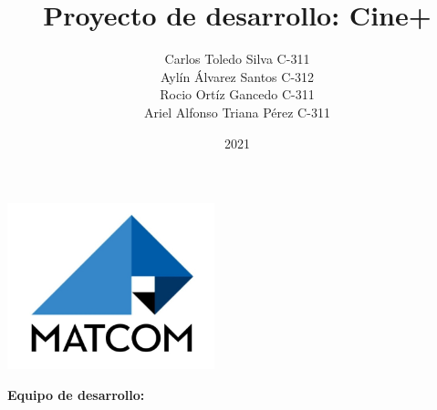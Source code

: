 \documentclass[letter,12pt]{book}
\begin{document}
\author{Carlos Toledo Silva		C-311\\Aylín Álvarez Santos		C-312\\Rocio Ortíz Gancedo		C-311\\Ariel Alfonso Triana Pérez 		C-311}
\title{Proyecto de desarrollo: Cine+}
\date{2021}

\makeatletter

\begin{titlepage}
\centering

\vspace{5cm}

{ \Huge \textbf{\@title}}

\vspace{5cm}

\includegraphics[width=6cm]{./img/logo-matcom.jpg}

\vspace{5cm}

\textbf{Equipo de desarrollo:}

 \@author

\vspace{1cm}

\@date
\end{titlepage}

\tableofcontents


\mainmatter








\backmatter

\end{document}
